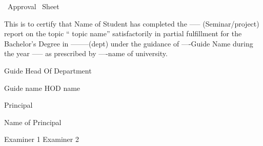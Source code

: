 
\newpage
\thispagestyle{empty}
\begin{center}
\LARGE{ Approval        Sheet}
\end{center}


\vspace{2cm}

This is to certify that Name of Student has completed the -----
(Seminar/project)
 report on the topic `` topic name'' satisfactorily in partial fulfillment for the Bachelor's Degree in --------(dept) under the guidance of ----Guide Name during the year ----- as prescribed by ----name of university.

\vspace{3cm}

\begin{flushleft}
Guide \hspace{95.00mm} Head Of Department\newline



Guide name \hspace{90.00mm}    HOD name
\end{flushleft}



\vspace{2cm}
\begin{center}
Principal



Name of Principal
\end{center}

\vspace{2cm}
\begin{flushleft}
Examiner 1 \hspace{100.00mm} Examiner 2
\end{flushleft}

\newpage




